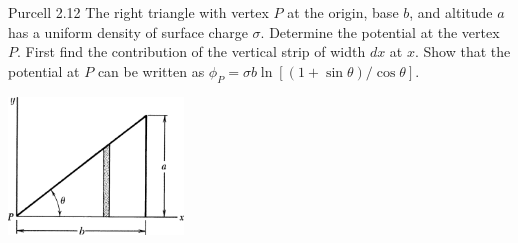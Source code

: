 \documentclass{esg8022pset}
\begin{document}
\begin{problem}{Purcell 2.12}
  The right triangle with vertex $P$ at the origin, base $b$, and altitude $a$ has a uniform density of surface charge $\sigma$. Determine the potential at the vertex $P$. First find the contribution of the vertical strip of width $dx$ at $x$. Show that the potential at $P$ can be written as $\phi_P = \sigma b \ln[(1 + \sin \theta) / \cos \theta]$. 
  \begin{center}\includegraphics[width=0.35\textwidth]{ps02_3}\end{center} 
\end{problem}
\end{document}
